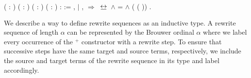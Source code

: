 \begin{singlespace}
\begin{coqdoccode}
\coqdocnoindent
{}
(  :
) (\coqdocvar{$\pi$} :
  ) (  :
) ( :
 
) :  :=\coqdoceol
\coqdocindent{1.00em}
 \coqdocvariable{$\pi$}, 
\coqdoceol
\coqdocindent{1.00em}
\ensuremath{|} 
\coqdocvar{\_} \coqdocvar{\_} \coqdocvar{$\rho$} 
\coqdocvar{$\sigma$} \coqdocvar{\_} \coqdocvar{\_} \coqdocvar{\_},
 \coqdocvar{\_}
\coqdocvar{\_}   
\coqdocvar{\_} \coqdocvar{\_} \coqdocvar{\_}
\ensuremath{\Rightarrow}\coqdoceol
\coqdocindent{2.00em}
 $\bis$  \ensuremath{\land}
\coqdocvariable{$\rho$} =  \ensuremath{\land}
(
( \coqdocvariable{$\rho$}))
\coqdocvariable{$\sigma$} \coqdoceol
\coqdocindent{1.00em}
.\coqdoceol
\end{coqdoccode}
\end{singlespace}

We describe a way to define rewrite sequences as an inductive type. A rewrite
sequence of length $\alpha$ can be represented by the Brouwer ordinal $\alpha$
where we label every occurrence of the $^+$ constructor with a rewrite
step. To ensure that successive steps have the same target and source terms,
respectively, we include the source and target terms of the rewrite sequence
in its type and label accordingly.


